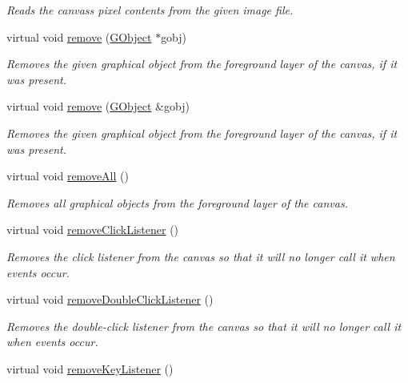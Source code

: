 \begin{DoxyCompactItemize}
\begin{DoxyCompactList}\small\item\em Reads the canvas\textquotesingle{}s pixel contents from the given image file. \end{DoxyCompactList}\item 
virtual void \mbox{\hyperlink{classGCanvas_a49dc57a2ce4caa354a5fff6acdde2e7d}{remove}} (\mbox{\hyperlink{classGObject}{G\+Object}} $\ast$gobj)
\begin{DoxyCompactList}\small\item\em Removes the given graphical object from the foreground layer of the canvas, if it was present. \end{DoxyCompactList}\item 
virtual void \mbox{\hyperlink{classGCanvas_a0c0ae4d69b584602ff3cba0d9cf330a4}{remove}} (\mbox{\hyperlink{classGObject}{G\+Object}} \&gobj)
\begin{DoxyCompactList}\small\item\em Removes the given graphical object from the foreground layer of the canvas, if it was present. \end{DoxyCompactList}\item 
virtual void \mbox{\hyperlink{classGCanvas_a9b0a5a3ad9972ab0e8eb0b54873aac6b}{remove\+All}} ()
\begin{DoxyCompactList}\small\item\em Removes all graphical objects from the foreground layer of the canvas. \end{DoxyCompactList}\item 
virtual void \mbox{\hyperlink{classGCanvas_ad39d0325cde6b97ebda4b9d7787c633b}{remove\+Click\+Listener}} ()
\begin{DoxyCompactList}\small\item\em Removes the click listener from the canvas so that it will no longer call it when events occur. \end{DoxyCompactList}\item 
virtual void \mbox{\hyperlink{classGCanvas_aa4250907e4cdd77349c04f0cf5cdd3d3}{remove\+Double\+Click\+Listener}} ()
\begin{DoxyCompactList}\small\item\em Removes the double-\/click listener from the canvas so that it will no longer call it when events occur. \end{DoxyCompactList}\item 
virtual void \mbox{\hyperlink{classGCanvas_a43095f41cab3be732b49f29970484b05}{remove\+Key\+Listener}} ()

\end{DoxyCompactItemize}
